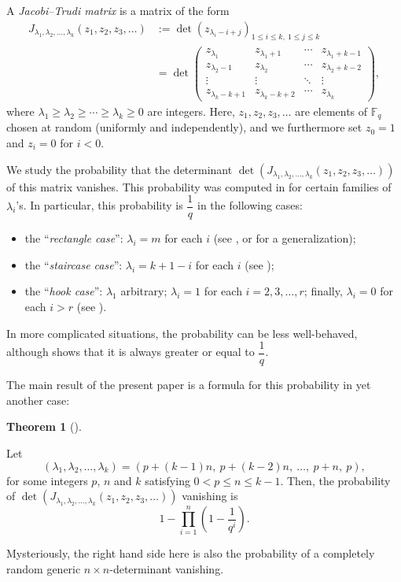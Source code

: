 \documentclass[numbers=enddot,12pt,final,onecolumn,notitlepage]{scrartcl}%
\theoremstyle{definition}
\newtheorem{theo}{Theorem}[section]
\newenvironment{theorem}[1][]
{\begin{theo}[#1]\begin{leftbar}}
{\end{leftbar}\end{theo}}
\let\prodnonlimits\prod
\renewcommand{\prod}{\prodnonlimits\limits}
\newcommand{\tup}[1]{\left( #1 \right)}
\newcommand{\Fq}{\mathbb{F}_q}
\renewcommand{\leq}{\leqslant}
\renewcommand{\geq}{\geqslant}
\theoremstyle{plainsl}
\begin{document}
A \emph{Jacobi--Trudi matrix} is a matrix of the form
\begin{align*}
J_{\lambda_1, \lambda_2, \ldots, \lambda_k}\tup{z_1, z_2, z_3, \ldots}
&:=
\det \left(  z_{\lambda_{i}-i+j}\right)_{1\leq i\leq k,\ 1\leq j\leq k}
\\
&= \det \begin{pmatrix}
z_{\lambda_1} & z_{\lambda_1 + 1} & \cdots & z_{\lambda_1 + k-1} \\
z_{\lambda_2 - 1} & z_{\lambda_2} & \cdots & z_{\lambda_2 + k-2} \\
\vdots & \vdots & \ddots & \vdots \\
z_{\lambda_k - k+1} & z_{\lambda_k - k+2} & \cdots & z_{\lambda_k}
\end{pmatrix} ,
\end{align*}
where $\lambda_{1} \geq \lambda_{2} \geq \cdots \geq \lambda_{k} \geq 0$ are integers.
Here, $z_1, z_2, z_3, \ldots$ are elements of $\Fq$ chosen at random (uniformly and independently), and we furthermore set $z_{0}=1$ and $z_{i}=0$ for $i<0$.

We study the probability that the determinant
$\det\tup{ J_{\lambda_1, \lambda_2, \ldots, \lambda_k}\tup{z_1, z_2, z_3, \ldots} }$
of this matrix vanishes.
This probability was computed in
\cite{Anzis18} for certain families of $\lambda_i$'s.
In particular, this probability is $\dfrac{1}{q}$ in the following cases:
\begin{itemize}
\item the ``\emph{rectangle case}'': $\lambda_i = m$ for each $i$ (see \cite[Corollary 6.4]{Anzis18}, or \cite{dwivedi2021rank} for a generalization);
\item the ``\emph{staircase case}'': $\lambda_i = k+1-i$ for each $i$ (see \cite[Theorem 6.5]{Anzis18});
\item the ``\emph{hook case}'': $\lambda_1$ arbitrary; $\lambda_i = 1$ for
each $i = 2, 3, \ldots, r$; finally, $\lambda_i = 0$ for each $i > r$ (see \cite[Proposition 1.2]{Anzis18}).
\end{itemize}
In more complicated situations, the probability can be less well-behaved,
although \cite[Corollary 5.2]{Anzis18} shows that it is always greater or
equal to $\dfrac{1}{q}$.

The main result of the present paper is a formula for this probability
in yet another case:
\begin{theorem}
\label{thm.n.staircase-intro}
Let
\[\left(\lambda_1, \lambda_2, \ldots, \lambda_k\right)
= (p+(k-1)n, \ p+(k-2)n, \ \ldots, \ p+n, \  p) , \]
for some integers $p$, $n$ and $k$ satisfying $0 < p \leq n \leq k-1$.
Then, the probability of
$\det\tup{ J_{\lambda_1, \lambda_2, \ldots, \lambda_k}\tup{z_1, z_2, z_3, \ldots} }$
vanishing is
\[
1- \prod_{i=1}^{n} \left(  1-\dfrac{1}{q^{i}}\right) .
\]
\end{theorem}
Mysteriously, the right hand side here is also the probability of a completely random generic $n\times n$-determinant vanishing.
\end{document}
